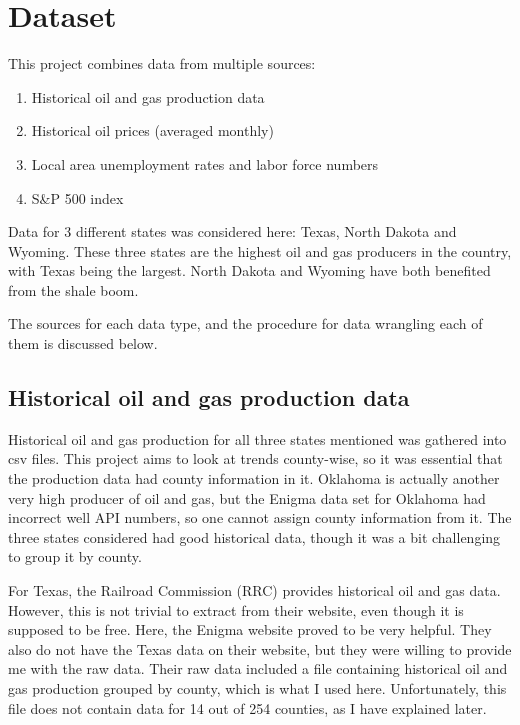 \documentclass[11pt,letterpaper]{article}
\begin{document}
\section{Dataset}

This project combines data from multiple sources:
\begin{enumerate}
\item Historical oil and gas production data
\item Historical oil prices (averaged monthly)
\item Local area unemployment rates and labor force numbers
\item S\&P 500 index
\end{enumerate}

Data for 3 different states was considered here: Texas, North Dakota and Wyoming. These three states are the highest oil and gas producers in the country, with Texas being the largest. North Dakota and Wyoming have both benefited from the shale boom.

The sources for each data type, and the procedure for data wrangling each of them is discussed below.

\subsection{Historical oil and gas production data}

Historical oil and gas production for all three states mentioned was gathered into csv files. This project aims to look at trends county-wise, so it was essential that the production data had county information in it. Oklahoma is actually another very high producer of oil and gas, but the Enigma data set for Oklahoma had incorrect well API numbers, so one cannot assign county information from it. The three states considered had good historical data, though it was a bit challenging to group it by county.
 
 For Texas, the Railroad Commission (RRC) provides historical oil and gas data. However, this is not trivial to extract from their website, even though it is supposed to be free. Here, the Enigma website proved to be very helpful. They also do not have the Texas data on their website, but they were willing to provide me with the raw data. Their raw data included a file containing historical oil and gas production grouped by county, which is what I used here. Unfortunately, this file does not contain data for 14 out of 254 counties, as I have explained later.
 
\end{document}
